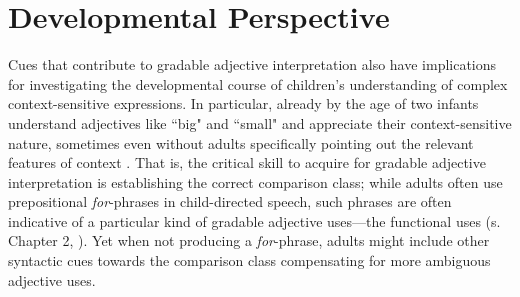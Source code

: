 \section{Developmental Perspective}
Cues that contribute to gradable adjective interpretation also have implications for investigating the developmental course of children's understanding of complex context-sensitive expressions. In particular, already by the age of two infants understand adjectives like ``big" and ``small" and appreciate their context-sensitive nature, sometimes even without adults specifically pointing out the relevant features of context \parencite{Mintz2002, ebeling1994children}. That is, the critical skill to acquire for gradable adjective interpretation is establishing the correct comparison class; while adults often use prepositional \emph{for}-phrases in child-directed speech, such phrases are often indicative of a particular kind of gradable adjective uses---the functional uses (s. Chapter 2, \textcite{ebeling1994children}). Yet when not producing a \emph{for}-phrase, adults might include other syntactic cues towards the comparison class compensating for more ambiguous adjective uses. 

